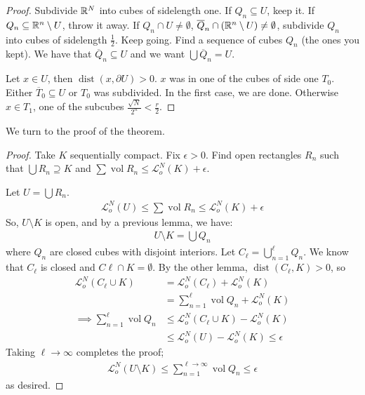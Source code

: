 \documentclass{report}
\DeclareMathOperator{\vol}{vol}
\DeclareMathOperator{\dist}{dist}
\begin{document}
\begin{proof}
    Subdivide $\RR^N$ into cubes of sidelength one. If $Q_n \subseteq U$, keep it. If $Q_n \subseteq \RR^n \setminus U$, throw it away. If $Q_n \cap U \neq \emptyset$, $\overline Q_n \cap   (\RR^n \setminus U) \neq \emptyset$, subdivide $Q_n$ into cubes of sidelength $\frac 12$. Keep going. Find a sequence of cubes $Q_n$ (the ones you kept). We have that $\overline Q_n \subseteq U$ and we want $\bigcup \overline Q_n =  U$. 

    Let $x \in U$, then $\dist(x, \partial U) > 0$. $x$ was in one of the cubes of side one $T_0$. Either $\overline T_0 \subseteq U$ or $T_0$ was subdivided. In the first case, we are done. Otherwise $x \in T_1$, one of the subcubes $\frac{\sqrt N}{2^n} < \frac r2$. 
\end{proof}
We turn to the proof of the theorem.
\begin{proof}
    Take $K$ sequentially compact. Fix $\epsilon > 0$. Find open rectangles $R_n$ such that $\bigcup R_n \supseteq K$ and $\sum \vol R_n  \leq \mathcal L_o^N(K) + \epsilon$. 

    Let $U = \bigcup R_n$.  \begin{align*}
        \mathcal L_o^N(U) \leq \sum \vol R_n \leq \mathcal L_o^N(K) + \epsilon
    \end{align*}
    So, $U \setminus K$ is open, and by a previous lemma, we have:
    \begin{align*}
        U \setminus K = \bigcup Q_n
    \end{align*}
    where $Q_n$ are closed cubes with disjoint interiors. Let $C_\ell = \bigcup_{n=1}^\ell Q_n$. We know that $C_\ell$ is closed  and $C\ell \cap K = \emptyset$. By the other lemma, $\dist(C_\ell, K) > 0$, so 
    \begin{align*}
        \mathcal L_o^N ( C_\ell \cup K) &= \mathcal L_o^N (C_\ell) + \mathcal L_o^N(K) \\
        &= \sum_{n=1}^\ell \vol Q_n + \mathcal L_o^N (K) \\
        \implies \sum_{n=1}^\ell \vol Q_n &\leq \mathcal L_o^N (C_\ell \cup K) - \mathcal L_o^N(K) \\
        &\leq \mathcal L_o^N(U) - \mathcal L_o^N(K) \leq \epsilon
    \end{align*}
    Taking $\ell \to \infty$ completes the proof; 
    \begin{align*}
        \mathcal L_o^N (U \setminus K) \leq \sum_{n =1}^{\ell \to \infty} \vol Q_n \leq \epsilon
    \end{align*}
    as desired.
\end{proof}
\end{document}
